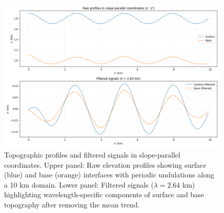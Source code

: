 \begin{figure}
    \includegraphics[scale=0.5]{base_surf_overlap.png}
    \caption{Topographic profiles and filtered signals in slope-parallel coordinates. Upper panel: Raw elevation profiles showing surface (blue) and base (orange) interfaces with periodic undulations along a 10 km domain. Lower panel: Filtered signals ($\lambda = 2.64$ km) highlighting wavelength-specific components of surface and base topography after removing the mean trend.}
    \label{fig:overlap}
\end{figure}
